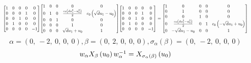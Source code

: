 \documentclass[11pt]{article}
\theoremstyle{definition}
\begin{document}
\[
\scaletoalign{\textwidth}{{\left[\begin{matrix}1 & 0 & 0 & 0 & 0\\0 & 0 & 0 & 1 & 0\\0 & 0 & 1 & 0 & 0\\0 & 1 & 0 & 0 & 0\\0 & 0 & 0 & 0 & -1\end{matrix}\right]} {\left[\begin{matrix}1 & 0 & 0 & 0 & 0\\0 & 1 & 0 & \frac{c_{0} \left(d u_{1}^{2} - u_{0}^{2}\right)}{2} & c_{0} \left(\sqrt{d} u_{1} - u_{0}\right)\\0 & 0 & 1 & 0 & 0\\0 & 0 & 0 & 1 & 0\\0 & 0 & 0 & \sqrt{d} u_{1} + u_{0} & 1\end{matrix}\right]} {\left[\begin{matrix}1 & 0 & 0 & 0 & 0\\0 & 0 & 0 & 1 & 0\\0 & 0 & 1 & 0 & 0\\0 & 1 & 0 & 0 & 0\\0 & 0 & 0 & 0 & -1\end{matrix}\right]} = {\left[\begin{matrix}1 & 0 & 0 & 0 & 0\\0 & 1 & 0 & 0 & 0\\0 & 0 & 1 & 0 & 0\\0 & \frac{c_{0} \left(d u_{1}^{2} - u_{0}^{2}\right)}{2} & 0 & 1 & c_{0} \left(- \sqrt{d} u_{1} + u_{0}\right)\\0 & - \sqrt{d} u_{1} - u_{0} & 0 & 0 & 1\end{matrix}\right]}}
\]
\[
\alpha = \left( 0, \  -2, \  0, \  0, \  0\right), \beta = \left( 0, \  2, \  0, \  0, \  0\right), \sigma_{\alpha}(\beta) = \left( 0, \  -2, \  0, \  0, \  0\right)
\]
\[
\scaletoalign{\textwidth}{w_{\alpha} X_{\beta}\left(u_{0}\right) w_{\alpha}^{-1} = X_{\sigma_{\alpha}\left(\beta\right)}\left(u_{0}\right)}
\]
\end{document}
